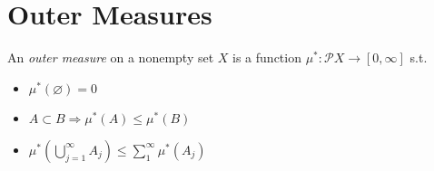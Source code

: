\section{Outer Measures}

\begin{definition}
    An \emph{outer measure} on a nonempty set \(X\) is a function \(\mu^\ast: \mathcal{P}X \to [0,\infty]\) s.t.
    \begin{itemize}
        \item \(\mu^\ast(\varnothing)=0\)
        \item \(A \subset B \Rightarrow \mu^\ast(A) \le \mu^\ast(B)\)
        \item \(\mu^\ast(\bigcup_{j=1}^{\infty} A_j) \le \sum_{1}^{\infty} \mu^\ast(A_j)\)
    \end{itemize}
\end{definition}